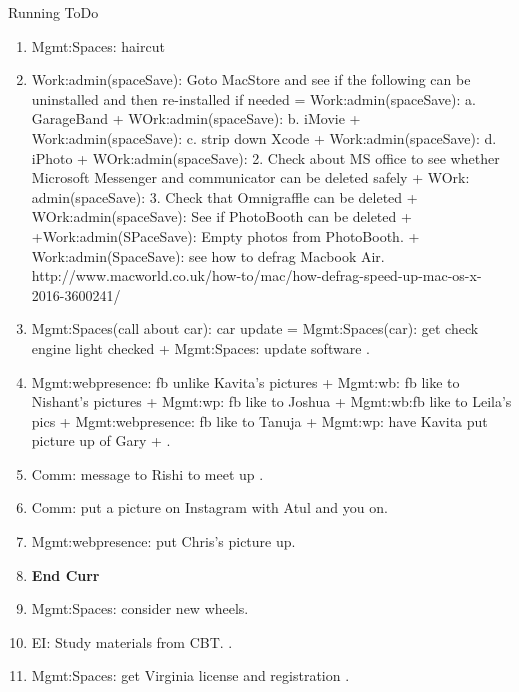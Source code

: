 \begin{columns}
\begin{column}{0.5\linewidth}
\begin{block}{Running ToDo}
\begin{enumerate}
        \item \tiny Mgmt:Spaces: haircut   

        \item \tiny Work:admin(spaceSave): Goto MacStore and see if the following can be uninstalled and then
          re-installed if needed = Work:admin(spaceSave):
          a. GarageBand  + WOrk:admin(spaceSave):  b. iMovie +
          Work:admin(spaceSave): c. strip down Xcode +
          Work:admin(spaceSave): d. iPhoto 
          + WOrk:admin(spaceSave): 2. Check about MS office to see whether Microsoft Messenger and
          communicator can be deleted safely 
          + WOrk: admin(spaceSave): 3. Check that Omnigraffle can be
          deleted + WOrk:admin(spaceSave): See if PhotoBooth can be deleted +
          +Work:admin(SPaceSave): Empty photos from PhotoBooth. 
          + Work:admin(SpaceSave): see how to defrag Macbook Air.
          http://www.macworld.co.uk/how-to/mac/how-defrag-speed-up-mac-os-x-2016-3600241/
          
        \item \tiny Mgmt:Spaces(call about car): car update = Mgmt:Spaces(car): get check engine light checked +
          Mgmt:Spaces: update software . 

        \item \tiny Mgmt:webpresence: fb unlike Kavita’s pictures + Mgmt:wb:
          fb like to Nishant's pictures +  Mgmt:wp: fb like to Joshua
          + Mgmt:wb:fb like to Leila's pics + Mgmt:webpresence: fb
          like to Tanuja + Mgmt:wp: have Kavita put picture up of Gary  + .


        \item \tiny Comm: message to Rishi to meet up .
        \item \tiny Comm: put a picture on Instagram with Atul and you on. 
        \item \tiny Mgmt:webpresence: put Chris's picture up. 

        \item \tiny  \textbf{End Curr} 

        \item \tiny  Mgmt:Spaces: consider new wheels.
        \item \tiny EI: Study materials from CBT.  
          .

        \item \tiny Mgmt:Spaces: get Virginia license and registration
          . 


\end{enumerate}
\end{block}
\end{column}
\end{columns}
